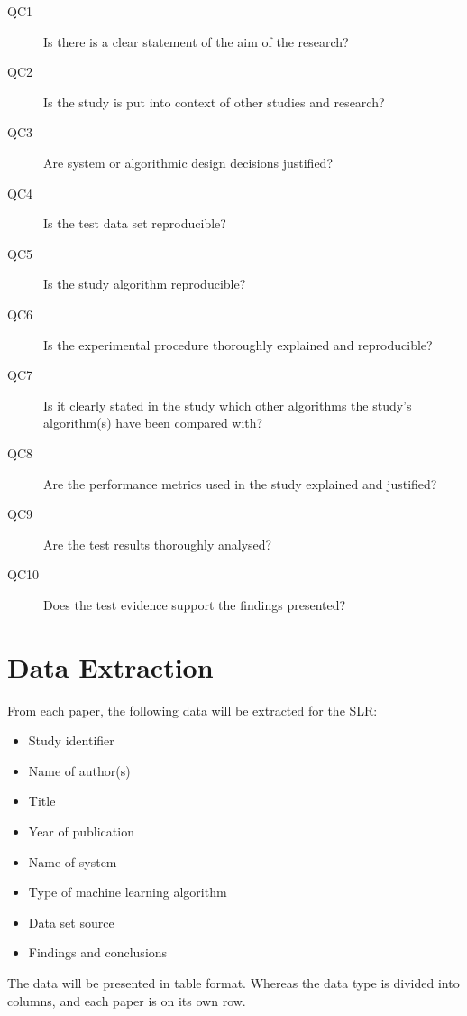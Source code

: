 \begin{description}

\item[QC1] Is there is a clear statement of the aim of the research?
\item[QC2] Is the study is put into context of other studies and research?
\item[QC3] Are system or algorithmic design decisions justified?
\item[QC4] Is the test data set reproducible?
\item[QC5] Is the study algorithm reproducible?
\item[QC6] Is the experimental procedure thoroughly explained and reproducible?
\item[QC7] Is it clearly stated in the study which other algorithms the study's algorithm(s) have been compared with?
\item[QC8] Are the performance metrics used in the study explained and justified?
\item[QC9] Are the test results thoroughly analysed?
\item[QC10] Does the test evidence support the findings presented?

\end{description}

\section{Data Extraction}

From each paper, the following data will be extracted for the SLR:

\begin{itemize}

\item Study identifier
\item Name of author(s) 
\item Title
\item Year of publication 
\item Name of system
\item Type of machine learning algorithm
\item Data set source
\item Findings and conclusions

\end{itemize}

The data will be presented in table format. Whereas the data type is divided into columns, and each paper is on its own row.